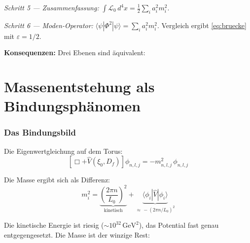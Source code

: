 \textit{Schritt 5 — Zusammenfassung:}
$\int\mathcal{L}_0\,d^4x = \tfrac{1}{2}\sum_i a_i^2 m_i^2$.

\textit{Schritt 6 — Moden-Operator:}
$\langle\psi|\Phi^2|\psi\rangle = \sum_i a_i^2 m_i^2$.
Vergleich ergibt \eqref{eq:bruecke} mit $\varepsilon = 1/2$.

\textbf{Konsequenzen:} Drei Ebenen sind äquivalent:

\begin{center}
{\footnotesize
{}
}
\end{center}

\part{Massenentstehung als Bindungsphänomen}

\section{Das Bindungsbild}

Die Eigenwertgleichung auf dem Torus:
\begin{equation}
  \left[\Box + \hat{V}(\xi_0, D_f)\right]\phi_{n,l,j} = -m_{n,l,j}^2\,\phi_{n,l,j}
\end{equation}

Die Masse ergibt sich als Differenz:
\begin{equation}
  m_i^2
  = \underbrace{\left(\frac{2\pi n}{L_0}\right)^2}_{\text{kinetisch}}
  + \underbrace{\langle\phi_i|\hat{V}|\phi_i\rangle}_{\approx\,-(2\pi n/L_0)^2}
\end{equation}

Die kinetische Energie ist riesig ($\sim 10^{32}\,\text{GeV}^2$), das Potential
fast genau entgegengesetzt. Die Masse ist der winzige Rest:

\begin{center}
{\footnotesize
{}
}
\end{center}

